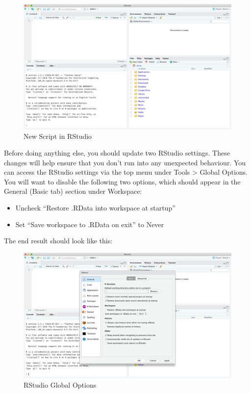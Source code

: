 \documentclass[
]{article}
\providecommand{\tightlist}{%
  \setlength{\itemsep}{0pt}\setlength{\parskip}{0pt}}
\begin{document}
\begin{figure}
\centering
\includegraphics{screenshots/4panes.png}
\caption{New Script in RStudio}
\end{figure}

Before doing anything else, you should update two RStudio settings.
These changes will help ensure that you don't run into any unexpected
behaviour. You can access the RStudio settings via the top menu under
Tools \textgreater{} Global Options. You will want to disable the
following two options, which should appear in the General (Basic tab)
section under Workspace:

\begin{itemize}
\tightlist
\item
  Uncheck ``Restore .RData into workspace at startup''
\item
  Set ``Save workspace to .RData on exit'' to Never
\end{itemize}

The end result should look like this:

\begin{figure}
\centering
\includegraphics{screenshots/options.png}
\caption{RStudio Global Options}
\end{figure}
\end{document}
